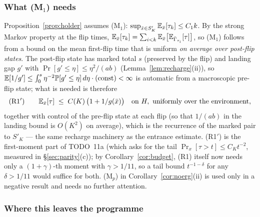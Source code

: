 \subsubsection{What (M\texorpdfstring{$_1$}{1}) needs}\label{sec:s13m1}

Proposition~\ref{prop:holder} assumes (M$_1$):
$\sup_{\bar x\in S'_K}\mathbb{E}_{\bar x}[\tau_k]\le C_1k$.  By the strong
Markov property at the flip times,
$\mathbb{E}_{\bar x}[\tau_k]=\sum_{i<k}\mathbb{E}_{\bar x}\bigl[\mathbb{E}_{\bar\Gamma_{\tau_i}}[\tau]\bigr]$,
so (M$_1$) follows from a bound on the mean first-flip time that is
uniform \emph{on average over post-flip states}.  The post-flip state
has marked total $s$ (preserved by the flip) and landing gap $g'$
with $\Pr[g'\le\eta]\le\eta^2/(ab)$ (Lemma~\ref{lem:recharge}(ii)),
so $\mathbb{E}[1/g']\le\int_0^{s}\eta^{-2}\mathbb{P}[g'\le\eta]\,d\eta\cdot
\text{(const)}<\infty$ is automatic from a macroscopic pre-flip
state; what is needed is therefore
\[
\text{(R1$'$)}\qquad
\mathbb{E}_{\bar x}[\tau]\;\le\;C(K)\,\bigl(1+1/g(\bar x)\bigr)\quad
\text{on }H,\ \text{uniformly over the environment},
\]
together with control of the pre-flip state at each flip (so that
$1/(ab)$ in the landing bound is $O(K^2)$ on average), which is the
recurrence of the marked pair to $S'_K$ --- the same recharge
machinery as the entrance estimate.  (R1$'$) is the first-moment
part of TODO~11a (which asks for the tail $\Pr_x[\tau>t]\le C_Kt^{-2}$,
measured in \S\ref{sec:parity}(c)); by Corollary~\ref{cor:budget},
(R1) itself now needs only a $(1+\gamma)$-th moment with
$\gamma>1/11$, so a tail bound $t^{-1-\delta}$ for any $\delta>1/11$
would suffice for both.  (M$_p$) in Corollary~\ref{cor:noerg}(ii) is
used only in a negative result and needs no further attention.

\subsubsection{Where this leaves the programme}\label{sec:s13spectral}

